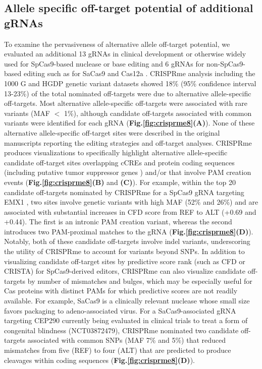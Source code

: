 \documentclass[a4paper, titlepage, openright]{book}
\newcommand{\crisprme}{CRISPRme\xspace}
\begin{document}
\begin{figure}
	\label{fig:crisprme7}
\end{figure}
\subsection{Allele specific off-target potential of additional gRNAs}
To examine the pervasiveness of alternative allele off-target potential, we evaluated an additional 13 gRNAs in clinical development or otherwise widely used for SpCas9-based nuclease or base editing \citep{xu2017crispr, xu2019crispr, stadtmauer2020crispr, gillmore2021crispr, dewitt2016selection, xu2019editing, metais2019genome, tsai2015guide, zeng2020therapeutic, musunuru2021vivo} and 6 gRNAs for non-SpCas9-based editing such as for SaCas9 and Cas12a \citep{xu2019editing, chu2021rationally, newby2021base, maeder2019development, de2019edit}. \crisprme analysis including the 1000 G and HGDP genetic variant datasets showed 18\% (95\% confidence interval 13-23\%) of the total nominated off-targets were due to alternative allele-specific off-targets. Most alternative allele-specific off-targets were associated with rare variants (MAF $<$ 1\%),  although candidate off-targets associated with common variants were identified for each gRNA (\textbf{Fig.\ref{fig:crisprme8}(A)}). None of these alternative allele-specific off-target sites were described in the original manuscripts reporting the editing strategies and off-target analyses. CRISPRme produces visualizations to specifically highlight alternative allele-specific candidate off-target sites overlapping cCREs and protein coding sequences (including putative tumor suppressor genes \citep{zhao2016tsgene}) and/or that involve PAM creation events (\textbf{Fig.\ref{fig:crisprme8}(B)} and \textbf{(C)}). For example, within the top 20 candidate off-targets nominated by CRISPRme for a SpCas9 gRNA targeting EMX1 \citep{tsai2015guide}, two sites involve genetic variants with high MAF (52\% and 26\%) and are associated with substantial increases in CFD score from REF to ALT (+0.69 and +0.44). The first is an intronic PAM creation variant, whereas the second introduces two PAM-proximal matches to the gRNA (\textbf{Fig.\ref{fig:crisprme8}(D)}).  Notably, both of these candidate off-targets involve indel variants, underscoring the utility of CRISPRme to account for variants beyond SNPs. In addition to visualizing candidate off-target sites by predictive score rank (such as CFD or CRISTA) for SpCas9-derived editors, \crisprme can also visualize candidate off-targets by number of mismatches and bulges, which may be especially useful for Cas proteins with distinct PAMs for which predictive scores are not readily available. For example, SaCas9 is a clinically relevant nuclease whose small size favors packaging to adeno-associated virus. For a SaCas9-associated gRNA targeting CEP290 \citep{maeder2019development} currently being evaluated in clinical trials to treat a form of congenital blindness (NCT03872479), CRISPRme nominated two candidate off-targets associated with common SNPs (MAF 7\% and 5\%) that reduced mismatches from five (REF) to four (ALT) that are predicted to produce cleavages within coding sequences (\textbf{Fig.\ref{fig:crisprme8}(D)}).
\end{document}

